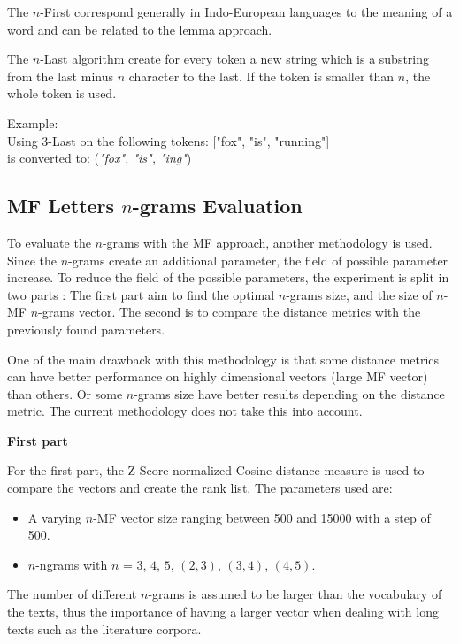 The $n$-First correspond generally in Indo-European languages to the meaning of a word and can be related to the lemma approach.

\begin{definition}[$n$-Last]
  \label{def:n_last}
  The $n$-Last algorithm create for every token a new string which is a substring from the last minus $n$ character to the last.
  If the token is smaller than $n$, the whole token is used.

  Example: \\
  Using $3$-Last on the following tokens: ["fox", "is", "running"] \\
  is converted to: (\textit{"fox", "is", "ing"})
\end{definition}

\subsection{MF Letters $n$-grams Evaluation}

To evaluate the $n$-grams with the MF approach, another methodology is used.
Since the $n$-grams create an additional parameter, the field of possible parameter increase.
To reduce the field of the possible parameters, the experiment is split in two parts :
The first part aim to find the optimal $n$-grams size, and the size of $n$-MF $n$-grams vector.
The second is to compare the distance metrics with the previously found parameters.

One of the main drawback with this methodology is that some distance metrics can have better performance on highly dimensional vectors (large MF vector) than others.
Or some $n$-grams size have better results depending on the distance metric.
The current methodology does not take this into account.

\textbf{First part}

For the first part, the Z-Score normalized Cosine distance measure is used to compare the vectors and create the rank list.
The parameters used are:

\begin{itemize}
  \item
  A varying $n$-MF vector size ranging between 500 and 15000 with a step of 500.
  \item
  $n$-ngrams with $n$ = $3$, $4$, $5$, $(2, 3)$, $(3, 4)$, $(4, 5)$.
\end{itemize}

The number of different $n$-grams is assumed to be larger than the vocabulary of the texts, thus the importance of having a larger vector when dealing with long texts such as the literature corpora.


